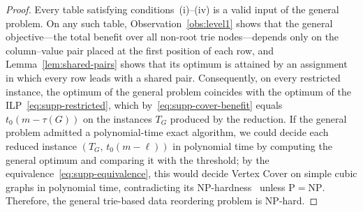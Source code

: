 \begin{proof}
Every table satisfying conditions~(i)--(iv) is a valid input of the general problem. On any such table, Observation~\ref{obs:level1} shows that the general objective---the total benefit over all non-root trie nodes---depends only on the column--value pair placed at the first position of each row, and Lemma~\ref{lem:shared-pairs} shows that its optimum is attained by an assignment in which every row leads with a shared pair. Consequently, on every restricted instance, the optimum of the general problem coincides with the optimum of the ILP~\eqref{eq:supp-restricted}, which by~\eqref{eq:supp-cover-benefit} equals $t_0(m-\tau(G))$ on the instances $T_G$ produced by the reduction. If the general problem admitted a polynomial-time exact algorithm, we could decide each reduced instance $(T_G,\,t_0(m-\ell))$ in polynomial time by computing the general optimum and comparing it with the threshold; by the equivalence~\eqref{eq:supp-equivalence}, this would decide Vertex Cover on simple cubic graphs in polynomial time, contradicting its NP-hardness~\cite{AlimontiKann2000} unless $\mathrm{P}=\mathrm{NP}$. Therefore, the general trie-based data reordering problem is NP-hard.
\end{proof}
